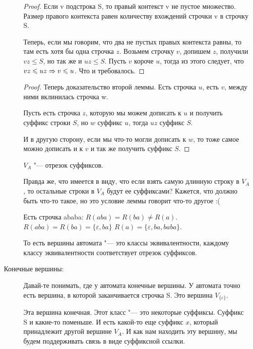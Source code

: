 \begin{description}
    \begin{proof}
    Если v подстрока S, то правый контекст v не пустое множество. Размер правого контекста равен количеству 
    вхождений строчки v в строчку S. 

    Теперь, если мы говорим, что два не пустых правых контекста равны, то там есть хотя бы одна строчка $z$.
    Возьмем строчку $v$, допишем $z$, получили $vz \le S$, но так же и $uz \le S$. Пусть $v$ короче $u$, тогда
    из этого следует, что $vz \leqslant uz \Rightarrow v \leqslant u$. Что и требовалось.
    \end{proof}
    \begin{proof}
    Теперь доказательство второй леммы. Есть строчка $u$, есть $v$, между ними вклинилась строчка w. 

    Пусть есть строчка $z$, которую мы можем дописать к $u$ и получить суффикс строки $S$, но $w$ суффикс $u$, тогда $uz$  суффикс $S$.

    И в другую сторону, если мы что-то могли дописать к $w$, то тоже самое можно дописать и к $v$ и так же получить суффикс $S$.
    \end{proof}
    
    \begin{lemma}
    $V_A$ "--- отрезок суффиксов.
    \end{lemma}
    \TODO Правда же, что имеется в виду, что если взять самую длинную строку в $V_A$, то остальные строки в $V_A$ будут ее суффиксами?
    Кажется, что должно быть что-то такое, но это условие леммы говорит что-то другое :( \TODO
    \begin{exmp}
    Есть строчка ababa:
    $R(aba) = R(ba) \ne R(a)$.
    $R(aba) = R(ba) = \{\varepsilon, ba\}$
    $R(a) = \{\varepsilon, ba, baba\}$.
    \end{exmp}

    То есть вершины автомата "--- это классы эквивалентности, каждому классу 
    эквивалентности соответствует отрезок суффиксов. 
    
    \item[Конечные вершины:]
    Давай-те понимать, где у автомата конечные вершины. У автомата точно есть 
    вершина, в которой заканчивается строчка S. Это вершина $V_{\{\varepsilon\}}$.

    Эта вершина конечная. Этот класс "--- это некоторые суффиксы. Суффикс S и какие-то поменьше.
    И есть какой-то еще суффикс $x$, который принадлежит другой вершине $V_A$. И как 
    нам находить эту вершину, мы будем поддерживать связь в виде суффиксной ссылки. 


\end{description}
